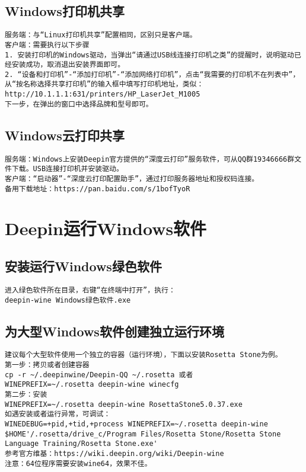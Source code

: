 \documentclass[a4paper,fontset=fandol,zihao=-4,linespread=1.2,oneside]{ctexbook}
\begin{document}
\section{Windows打印机共享}
\begin{lstlisting}
服务端：与“Linux打印机共享”配置相同，区别只是客户端。
客户端：需要执行以下步骤
1. 安装打印机的Windows驱动，当弹出“请通过USB线连接打印机之类”的提醒时，说明驱动已经安装成功，取消退出安装界面即可。
2. “设备和打印机”-“添加打印机”-“添加网络打印机”，点击“我需要的打印机不在列表中”，从“按名称选择共享打印机”的输入框中填写打印机地址，类似：
http://10.1.1.1:631/printers/HP_LaserJet_M1005
下一步，在弹出的窗口中选择品牌和型号即可。
\end{lstlisting}

\section{Windows云打印共享}
\begin{lstlisting}
服务端：Windows上安装Deepin官方提供的“深度云打印”服务软件，可从QQ群19346666群文件下载。USB连接打印机并安装驱动。
客户端：“启动器”-“深度云打印配置助手”，通过打印服务器地址和授权码连接。
备用下载地址：https://pan.baidu.com/s/1bofTyoR
\end{lstlisting}


\chapter{Deepin运行Windows软件}

\section{安装运行Windows绿色软件}
\begin{lstlisting}
进入绿色软件所在目录，右键“在终端中打开”，执行：
deepin-wine Windows绿色软件.exe
\end{lstlisting}

\section{为大型Windows软件创建独立运行环境}
\begin{lstlisting}
建议每个大型软件使用一个独立的容器（运行环境），下面以安装Rosetta Stone为例。
第一步：拷贝或者创建容器
cp -r ~/.deepinwine/Deepin-QQ ~/.rosetta 或者
WINEPREFIX=~/.rosetta deepin-wine winecfg
第二步：安装
WINEPREFIX=~/.rosetta deepin-wine RosettaStone5.0.37.exe
如遇安装或者运行异常，可调试：
WINEDEBUG=+pid,+tid,+process WINEPREFIX=~/.rosetta deepin-wine $HOME'/.rosetta/drive_c/Program Files/Rosetta Stone/Rosetta Stone Language Training/Rosetta Stone.exe'
参考官方维基：https://wiki.deepin.org/wiki/Deepin-wine
注意：64位程序需要安装wine64，效果不佳。
\end{lstlisting}
\end{document}
